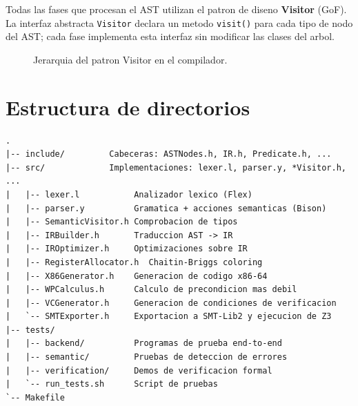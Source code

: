 Todas las fases que procesan el AST utilizan el patron de diseno
\textbf{Visitor} (GoF). La interfaz abstracta \texttt{Visitor} declara un
metodo \texttt{visit()} para cada tipo de nodo del AST; cada fase
implementa esta interfaz sin modificar las clases del arbol.

\begin{figure}[H]
\centering
{}
\caption{Jerarquia del patron Visitor en el compilador.}
\label{fig:visitor}
\end{figure}

\section{Estructura de directorios}

\begin{lstlisting}[style=pseudo, caption={Organizacion del repositorio}]
.
|-- include/         Cabeceras: ASTNodes.h, IR.h, Predicate.h, ...
|-- src/             Implementaciones: lexer.l, parser.y, *Visitor.h, ...
|   |-- lexer.l           Analizador lexico (Flex)
|   |-- parser.y          Gramatica + acciones semanticas (Bison)
|   |-- SemanticVisitor.h Comprobacion de tipos
|   |-- IRBuilder.h       Traduccion AST -> IR
|   |-- IROptimizer.h     Optimizaciones sobre IR
|   |-- RegisterAllocator.h  Chaitin-Briggs coloring
|   |-- X86Generator.h    Generacion de codigo x86-64
|   |-- WPCalculus.h      Calculo de precondicion mas debil
|   |-- VCGenerator.h     Generacion de condiciones de verificacion
|   `-- SMTExporter.h     Exportacion a SMT-Lib2 y ejecucion de Z3
|-- tests/
|   |-- backend/          Programas de prueba end-to-end
|   |-- semantic/         Pruebas de deteccion de errores
|   |-- verification/     Demos de verificacion formal
|   `-- run_tests.sh      Script de pruebas
`-- Makefile
\end{lstlisting}
